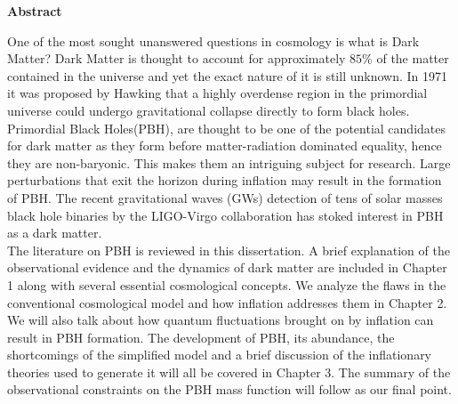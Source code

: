 \newpage
\begin{center}
    \huge \textbf{Abstract}
\end{center}

\vspace{0.5in}

One of the most sought unanswered questions in cosmology is what is Dark Matter? Dark Matter is thought to account for approximately $ 85\%$ of the matter contained in the universe and yet the exact nature of it is still unknown.  In 1971 it was proposed by Hawking\cite{1971MNRAS.152...75H} that a highly overdense region in the primordial universe could undergo gravitational collapse directly to form black holes.  Primordial Black Holes(PBH), are thought to be one of the potential candidates for dark matter as they form before matter-radiation dominated equality, hence they are non-baryonic. This makes them an intriguing subject for research. Large perturbations that exit the horizon during inflation may result in the formation of PBH. The recent gravitational waves (GWs) detection of tens of solar  masses black hole binaries by the LIGO-Virgo collaboration has stoked interest in PBH as a dark matter. \\
The literature on PBH is reviewed in this dissertation. A brief explanation of the observational evidence and the dynamics of dark matter are included in Chapter 1 along with several essential cosmological concepts. We analyze the flaws in the conventional cosmological model and how inflation addresses them in Chapter 2. We will also talk about how quantum fluctuations brought on by inflation can result in PBH formation. The development of PBH, its abundance, the shortcomings of the simplified model and a brief discussion of the inflationary theories used to generate it will all be covered in Chapter 3. The summary of the observational constraints on the PBH mass function will follow as our final point.
